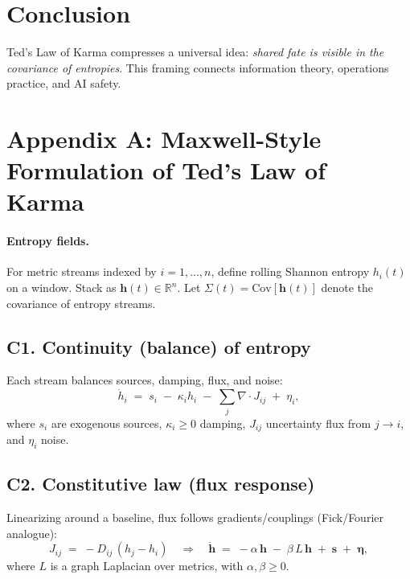 \documentclass[11pt]{article}
\begin{document}
\section{Conclusion}
Ted's Law of Karma compresses a universal idea: 
\emph{shared fate is visible in the covariance of entropies}.
This framing connects information theory, operations practice, and AI safety.

\appendix
\section*{Appendix A: Maxwell-Style Formulation of Ted's Law of Karma}

\paragraph{Entropy fields.}
For metric streams indexed by $i=1,\dots,n$, define rolling Shannon entropy $h_i(t)$ on a window. Stack as $\mathbf{h}(t)\in\mathbb{R}^n$. Let $\Sigma(t)=\mathrm{Cov}[\mathbf{h}(t)]$ denote the covariance of entropy streams.

\subsection*{C1. Continuity (balance) of entropy}
Each stream balances sources, damping, flux, and noise:
\begin{equation}
\dot h_i \;=\; s_i \;-\; \kappa_i h_i \;-\; \sum_{j}\nabla\!\cdot J_{ij} \;+\; \eta_i,
\end{equation}
where $s_i$ are exogenous sources, $\kappa_i\!\ge 0$ damping, $J_{ij}$ uncertainty flux from $j\!\to\! i$, and $\eta_i$ noise.

\subsection*{C2. Constitutive law (flux response)}
Linearizing around a baseline, flux follows gradients/couplings (Fick/Fourier analogue):
\begin{equation}
J_{ij} \;=\; -D_{ij}\,(h_j-h_i)
\quad\Longrightarrow\quad
\dot{\mathbf h} \;=\; -\alpha\,\mathbf h \;-\; \beta\,L\,\mathbf h \;+\; \mathbf s \;+\; \boldsymbol\eta,
\end{equation}
where $L$ is a graph Laplacian over metrics, with $\alpha,\beta\!\ge 0$.
\end{document}

